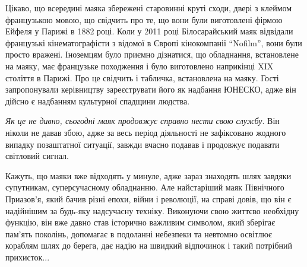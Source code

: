 Цікаво, що всередині маяка збережені старовинні круті сходи, двері з клеймом
французькою мовою, що свідчить про те, що вони були виготовлені фірмою Ейфеля у
Парижі в 1882 році. Коли у 2011 році Білосарайський маяк відвідали французькі
кінематографісти з відомої в Європі кінокомпанії \enquote{Nofilm}, вони були просто
вражені. Іноземцям було приємно дізнатися, що обладнання, встановлене на маяку,
має французьке походження і було виготовлено наприкінці XIX століття в Парижі.
Про це свідчить і табличка, встановлена на маяку. Гості запропонували
керівництву зареєструвати його як надбання ЮНЕСКО, адже він дійсно є надбанням
культурної спадщини людства.

\emph{Як це не дивно, сьогодні маяк продовжує справно нести свою службу}. Він ніколи
не давав збою, адже за весь період діяльності не зафіксовано жодного випадку
позаштатної ситуації, завжди вчасно подавав і продовжує подавати світловий
сигнал.


Кажуть, що маяки вже відходять у минуле, адже зараз знаходять шлях завдяки
супутникам, суперсучасному обладнанню. Але найстаріший маяк Північного
Приазов'я, який бачив різні епохи, війни і революції, на справі довів, що він є
надійнішим за будь-яку надсучасну техніку. Виконуючи свою життєво необхідну
функцію, він вже давно став історично важливим символом, який зберігає пам'ять
поколінь, допомагає в подоланні небезпеки та невтомно освітлює кораблям шлях до
берега, дає надію на швидкий відпочинок і такий потрібний прихисток... 
